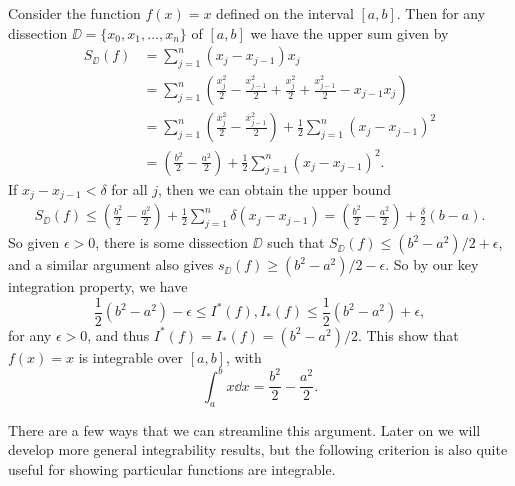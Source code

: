 \documentclass[a4paper]{scrartcl}
\begin{document}
\begin{example}[$f(x) = x$ is Integrable]
	Consider the function $f(x) = x$ defined on the interval $[a, b]$. Then for any dissection $\DD = \{x_0, x_1, \dots, x_n\}$ of $[a, b]$ we have the upper sum given by
	\begin{align*}
		S_{\DD}(f) &= \sum_{j = 1}^{n} (x_j - x_{j - 1}) x_j \\
				&= \sum_{j = 1}^n \left(\frac{x_j^2}{2} - \frac{x_{j - 1}^2}{2}+ \frac{x_j^2}{2} + \frac{x_{j-1}^2}{2}- x_{j - 1}x_j\right) \\
				&= \sum_{j = 1}^n \left(\frac{x_j^2}{2} - \frac{x_{j - 1}^2}{2}\right) +\frac{1}{2} \sum_{j = 1}^{n}\left(x_j - x_{j - 1}\right)^2 \\
				&= \left(\frac{b^2}{2} - \frac{a^2}{2}\right) +\frac{1}{2} \sum_{j = 1}^{n}\left(x_j - x_{j - 1}\right)^2.
	\end{align*}
	If $x_{j} - x_{j - 1} < \delta$ for all $j$, then we can obtain the upper bound
	\begin{align*}
		S_{\DD}(f) \leq \left(\frac{b^2}{2} - \frac{a^2}{2}\right) +\frac{1}{2} \sum_{j = 1}^{n}\delta\left(x_j - x_{j - 1}\right) = \left(\frac{b^2}{2} - \frac{a^2}{2}\right) + \frac{\delta}{2}(b - a).
	\end{align*}
	So given $\epsilon > 0$, there is some dissection $\DD$ such that $S_{\DD}(f) \leq (b^2 - a^2)/2 + \epsilon$, and a similar argument also gives $s_{\DD}(f) \geq (b^2 - a^2)/2 - \epsilon$. So by our key integration property, we have
	$$
	\frac{1}{2}(b^2 - a^2) - \epsilon \leq I^*(f), I_*(f) \leq \frac{1}{2}(b^2 - a^2) + \epsilon,
	$$
	for any $\epsilon > 0$, and thus $I^*(f) = I_*(f) = (b^2 - a^2)/2$. This show that $f(x) = x$ is integrable over $[a, b]$, with
	$$
	\int_a^b x \dd x = \frac{b^2}{2} - \frac{a^2}{2}.
	$$
\end{example}

There are a few ways that we can streamline this argument. Later on we will develop more general integrability results, but the following criterion is also quite useful for showing particular functions are integrable.
\end{document}
